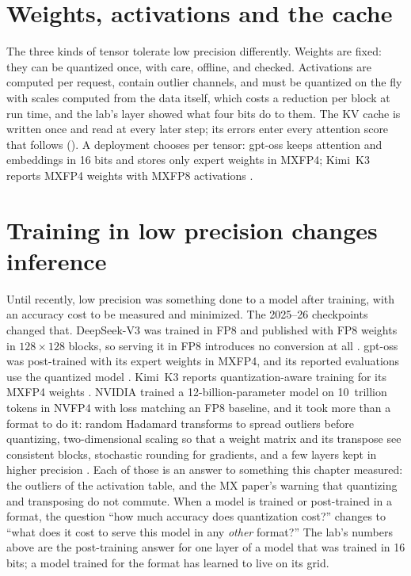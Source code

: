 \section{Weights, activations and the cache}

The three kinds of tensor tolerate low precision differently. Weights are
fixed: they can be quantized once, with care, offline, and checked. Activations
are computed per request, contain outlier channels, and must be quantized on
the fly with scales computed from the data itself, which costs a reduction per
block at run time, and the lab's layer showed what four bits do to them. The KV cache is written once and read at every later step;
its errors enter every attention score that follows
(). A deployment chooses per tensor: gpt-oss keeps
attention and embeddings in 16 bits and stores only expert weights in MXFP4;
Kimi~K3 reports MXFP4 weights with MXFP8 activations
\cite{moonshot2026kimik3}.

\section{Training in low precision changes inference}

Until recently, low precision was something done to a model after training,
with an accuracy cost to be measured and minimized. The 2025--26 checkpoints
changed that. DeepSeek-V3 was trained in FP8 and published with FP8 weights in
$128\times128$ blocks, so serving it in FP8 introduces no conversion at all
\cite{deepseek2024v3}. gpt-oss was post-trained with its expert weights in
MXFP4, and its reported evaluations use the quantized model
\cite{openai2025gptoss}. Kimi~K3 reports quantization-aware training for its
MXFP4 weights \cite{moonshot2026kimik3}. NVIDIA trained a 12-billion-parameter
model on 10~trillion tokens in NVFP4 with loss matching an FP8 baseline, and
it took more than a format to do it: random Hadamard transforms to spread
outliers before quantizing, two-dimensional scaling so that a weight matrix and
its transpose see consistent blocks, stochastic rounding for gradients, and a
few layers kept in higher precision \cite{nvidia2025nvfp4pretrain}. Each of
those is an answer to something this chapter measured: the outliers of the
activation table, and the MX paper's warning that quantizing and transposing do
not commute. When a model is trained or post-trained in a
format, the question ``how much accuracy does quantization cost?'' changes to
``what does it cost to serve this model in any \emph{other} format?'' The
lab's numbers above are the post-training answer for one layer of a model
that was trained in 16 bits; a model trained for the format has learned to
live on its grid.

